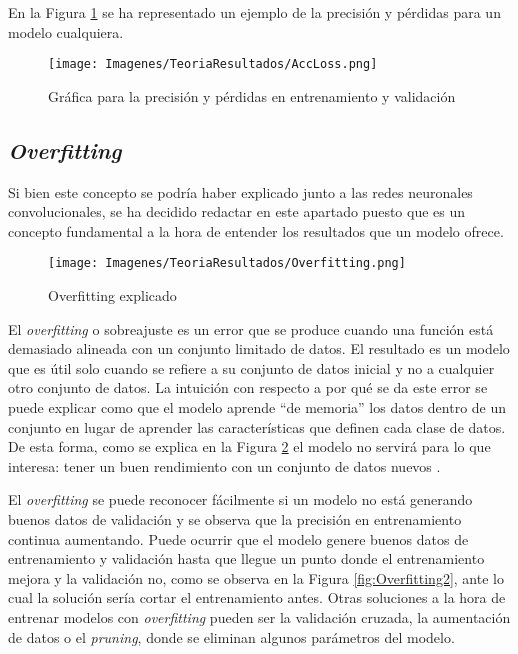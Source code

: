 \documentclass{report}
\begin{document}
En la Figura \ref{fig:EjAcc&Loss} se ha representado un ejemplo de la precisión y pérdidas para un modelo cualquiera.


\begin{figure}[hbpt]
      \centering
	 \texttt{[image: Imagenes/TeoriaResultados/AccLoss.png]}
	 \caption{ Gráfica para la precisión y pérdidas en entrenamiento y validación  }
	 \label{fig:EjAcc&Loss}
\end{figure}



\subsection{\textit{Overfitting}}

Si bien este concepto se podría haber explicado junto a las redes neuronales convolucionales, se ha decidido redactar en este apartado puesto que es un concepto fundamental a la hora de entender los resultados que un modelo ofrece.

\begin{figure}[hbpt]
      \centering
	 \texttt{[image: Imagenes/TeoriaResultados/Overfitting.png]}
	 \caption{ Overfitting explicado \cite{OverfittingImagen} }
	 \label{fig:Overfitting}
\end{figure}

El \textit{overfitting} o sobreajuste es un error que se produce cuando una función está demasiado alineada con un conjunto limitado de datos. El resultado es un modelo que es útil solo cuando se refiere a su conjunto de datos inicial y no a cualquier otro conjunto de datos. La intuición con respecto a por qué se da este error se puede explicar como que el modelo aprende ``de memoria'' los datos dentro de un conjunto en lugar de aprender las características que definen cada clase de datos. De esta forma, como se explica en la Figura \ref{fig:Overfitting} el modelo no servirá para lo que interesa: tener un buen rendimiento con un conjunto de datos nuevos \cite{Overfitting}.


El \textit{overfitting} se puede reconocer fácilmente si un modelo no está generando buenos datos de validación y se observa que la precisión en entrenamiento continua aumentando. Puede ocurrir que el modelo genere buenos datos de entrenamiento y validación hasta que llegue un punto donde el entrenamiento mejora y la validación no, como se observa en la Figura \ref{fig:Overfitting2}, ante lo cual la solución sería cortar el entrenamiento antes. Otras soluciones a la hora de entrenar modelos con \textit{overfitting} pueden ser la validación cruzada, la aumentación de datos o el \textit{pruning}, donde se eliminan algunos parámetros del modelo.
\end{document}
